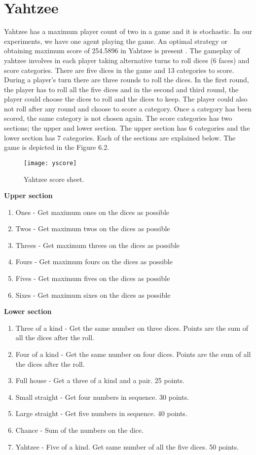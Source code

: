 \documentclass[double,12pt]{beavtex}
\begin{document}
\section{Yahtzee}
Yahtzee has a maximum player count of two in a game and it is stochastic. In our experiments, we have one agent playing the game. An optimal strategy or obtaining maximum score of 254.5896 in Yahtzee is present \cite{glenn2006optimal}. The gameplay of yahtzee involves in each player taking alternative turns to roll dices (6 faces) and score categories. There are five dices in the game and 13 categories to score. During a player's turn there are three rounds to roll the dices. In the first round, the player has to roll all the five dices and in the second and third round, the player could choose the dices to roll and the dices to keep. The player could also not roll after any round and choose to score a category. Once a category has been scored, the same category is not chosen again. The score categories has two sections; the upper and lower section. The upper section has 6 categories and the lower section has 7 categories. Each of the sections are explained below. The game is depicted in the Figure 6.2.

\begin{figure}
\centering
\texttt{[image: yscore]}
\caption{Yahtzee score sheet\cite{yahtzeerules}.}
\end{figure}

\noindent\textbf{Upper section}

\begin{enumerate}
\item Ones - Get maximum ones on the dices as possible 
\item Twos - Get maximum twos on the dices as possible 
\item Threes - Get maximum threes on the dices as possible 
\item Fours - Get maximum fours on the dices as possible 
\item Fives - Get maximum fives on the dices as possible 
\item Sixes - Get maximum sixes on the dices as possible 
\end{enumerate}

\noindent\textbf{Lower section}

\begin{enumerate}
\item Three of a kind - Get the same number on three dices. Points are the sum of all the dices after the roll. 
\item Four of a kind - Get the same number on four dices. Points are the sum of all the dices after the roll. 
\item Full house - Get a three of a kind and a pair. 25 points. 
\item Small straight - Get four numbers in sequence. 30 points. 
\item Large straight - Get five numbers in sequence. 40 points. 
\item Chance - Sum of the numbers on the dice. 
\item Yahtzee - Five of a kind. Get same number of all the five dices. 50 points. 
\end{enumerate}
\end{document}
